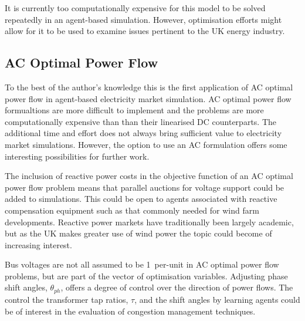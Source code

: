 It is currently too computationally expensive for this model to be solved
repeatedly in an agent-based simulation.  However, optimisation efforts might
allow for it to be used to examine issues pertinent to the UK energy industry.


\subsection{AC Optimal Power Flow}
To the best of the author's knowledge this is the first application of AC
optimal power flow in agent-based electricity market simulation.  AC optimal
power flow formualtions are more difficult to implement and the problems are
more computationally expensive than than their linearised DC counterparts.  The
additional time and effort does not always bring sufficient value to
electricity market simulations.  However, the option to use an AC formulation
offers some interesting possibilities for further work.

The inclusion of reactive power costs in the objective function of an AC
optimal power flow problem means that parallel auctions for voltage support
could be added to simulations.  This could be open to agents associated with
reactive compensation equipment such as that commonly needed for wind farm
developments.  Reactive power markets have traditionally been largely
academic, but as the UK makes greater use of wind power the topic could
become of increasing interest.

Bus voltages are not all assumed to be 1~per-unit in AC optimal power flow
problems, but are part of the vector of optimisation variables.  Adjusting
phase shift angles, $\theta_{ph}$, offers a degree of control over the
direction of power flows.  The control the transformer tap ratios, $\tau$, and
the shift angles by learning agents could be of interest in the evaluation of
congestion management techniques.

